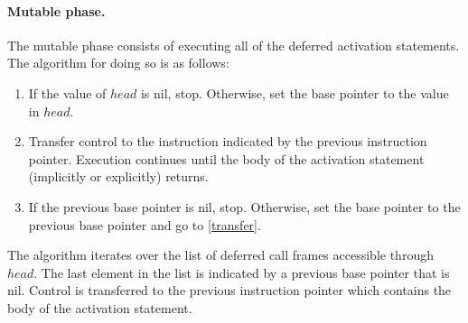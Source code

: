 \paragraph{Mutable phase.}
The mutable phase consists of executing all of the deferred activation statements.
The algorithm for doing so is as follows:
\begin{enumerate}
\item If the value of $head$ is nil, stop.  Otherwise, set the base pointer to the value in $head$.
\item Transfer control to the instruction indicated by the previous instruction pointer\label{transfer}.  Execution continues until the body of the activation statement (implicitly or explicitly) returns.
\item If the previous base pointer is nil, stop.  Otherwise, set the base pointer to the previous base pointer and go to \ref{transfer}.
\end{enumerate}

The algorithm iterates over the list of deferred call frames accessible through $head$.
The last element in the list is indicated by a previous base pointer that is nil.
Control is transferred to the previous instruction pointer which contains the body of the activation statement.

